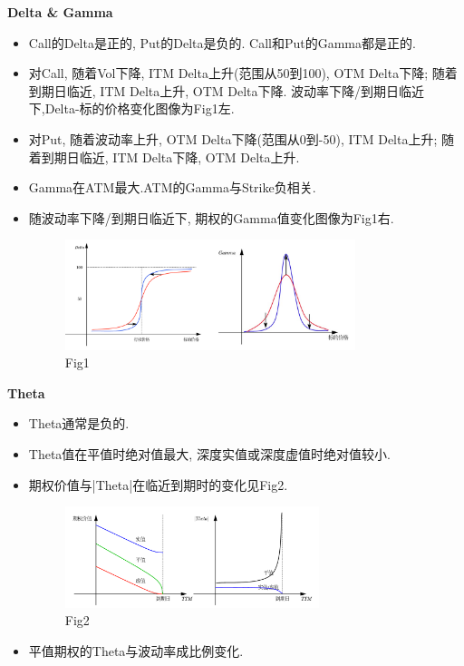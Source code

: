 \documentclass[UTF8]{ctexart}
\begin{document}
\noindent \textbf{Delta \& Gamma} \par 
\begin{itemize}
\item Call的Delta是正的, Put的Delta是负的. Call和Put的Gamma都是正的.
\item 对Call, 随着Vol下降, ITM Delta上升(范围从50到100), OTM Delta下降;
随着到期日临近, ITM Delta上升, OTM Delta下降.
波动率下降/到期日临近下,Delta-标的价格变化图像为Fig1左.
\item 对Put, 随着波动率上升, OTM Delta下降(范围从0到-50), ITM Delta上升;
随着到期日临近, ITM Delta下降, OTM Delta上升.
\item Gamma在ATM最大.ATM的Gamma与Strike负相关.
\item 随波动率下降/到期日临近下, 期权的Gamma值变化图像为Fig1右.
\begin{figure}[H]
    \centering
    \includegraphics[width=0.8\textwidth]{fig/fig1.png}
    \caption{Fig1}
\end{figure}

\end{itemize}

\noindent \textbf{Theta} \par 
\begin{itemize}
\item Theta通常是负的.
\item Theta值在平值时绝对值最大, 深度实值或深度虚值时绝对值较小.
\item 期权价值与|Theta|在临近到期时的变化见Fig2.
\begin{figure}[H]
    \centering
    \includegraphics[width=0.7\textwidth]{fig/fig2.png}
    \caption{Fig2}
\end{figure}
\item 平值期权的Theta与波动率成比例变化.
\end{itemize}
\end{document}
